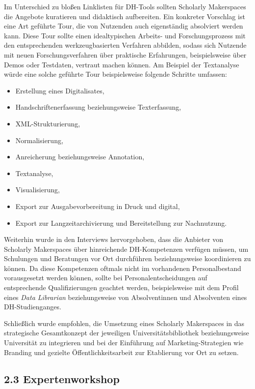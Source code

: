 \documentclass[a4paper,
fontsize=11pt,
oneside,
numbers=noperiodatend,
parskip=half-,
bibliography=totoc,
final
]{scrartcl}
\begin{document}
Im Unterschied zu bloßen Linklisten für DH-Tools sollten Scholarly
Makerspaces die Angebote kuratieren und didaktisch aufbereiten. Ein
konkreter Vorschlag ist eine Art geführte Tour, die von Nutzenden auch
eigenständig absolviert werden kann. Diese Tour sollte einen
idealtypischen Arbeits- und Forschungsprozess mit den entsprechenden
werkzeugbasierten Verfahren abbilden, sodass sich Nutzende mit neuen
Forschungsverfahren über praktische Erfahrungen, beispielsweise über
Demos oder Testdaten, vertraut machen können. Am Beispiel der
Textanalyse würde eine solche geführte Tour beispielsweise folgende
Schritte umfassen:

\begin{itemize}

\item
  Erstellung eines Digitalisates,
\item
  Handschriftenerfassung beziehungsweise Texterfassung,
\item
  XML-Strukturierung,
\item
  Normalisierung,
\item
  Anreicherung beziehungsweise Annotation,
\item
  Textanalyse,
\item
  Visualisierung,
\item
  Export zur Ausgabevorbereitung in Druck und digital,
\item
  Export zur Langzeitarchivierung und Bereitstellung zur Nachnutzung.
\end{itemize}

Weiterhin wurde in den Interviews hervorgehoben, dass die Anbieter von
Scholarly Makerspaces über hinreichende DH-Kompetenzen verfügen müssen,
um Schulungen und Beratungen vor Ort durchführen beziehungsweise
koordinieren zu können. Da diese Kompetenzen oftmals nicht im
vorhandenen Personalbestand vorausgesetzt werden können, sollte bei
Personalentscheidungen auf entsprechende Qualifizierungen geachtet
werden, beispielsweise mit dem Profil eines \emph{Data Librarian}
beziehungsweise von Absolventinnen und Absolventen eines
DH-Studienganges.

Schließlich wurde empfohlen, die Umsetzung eines Scholarly Makerspaces
in das strategische Gesamtkonzept der jeweiligen Universitätsbibliothek
beziehungsweise Universität zu integrieren und bei der Einführung auf
Marketing-Strategien wie Branding und gezielte Öffentlichkeitsarbeit zur
Etablierung vor Ort zu setzen.

\hypertarget{expertenworkshop}{%
\subsection{2.3 Expertenworkshop}\label{expertenworkshop}}
\end{document}

